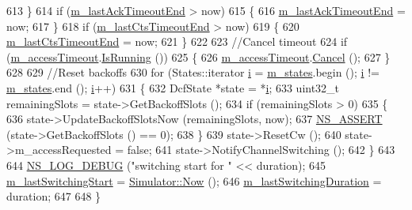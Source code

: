 \begin{DoxyCode}
613     \}
614   \textcolor{keywordflow}{if} (\hyperlink{classns3_1_1DcfManager_a8a224e47f94cc69bc3dd0d88f2099a15}{m\_lastAckTimeoutEnd} > now)
615     \{
616       \hyperlink{classns3_1_1DcfManager_a8a224e47f94cc69bc3dd0d88f2099a15}{m\_lastAckTimeoutEnd} = now;
617     \}
618   \textcolor{keywordflow}{if} (\hyperlink{classns3_1_1DcfManager_abeffda3976f92d50616835e3b8b34e32}{m\_lastCtsTimeoutEnd} > now)
619     \{
620       \hyperlink{classns3_1_1DcfManager_abeffda3976f92d50616835e3b8b34e32}{m\_lastCtsTimeoutEnd} = now;
621     \}
622 
623   \textcolor{comment}{//Cancel timeout}
624   \textcolor{keywordflow}{if} (\hyperlink{classns3_1_1DcfManager_aa14d379408c9430ab07539536ab8d72e}{m\_accessTimeout}.\hyperlink{classns3_1_1EventId_aabf8476d1a080c199ea0c6aa9ccea372}{IsRunning} ())
625     \{
626       \hyperlink{classns3_1_1DcfManager_aa14d379408c9430ab07539536ab8d72e}{m\_accessTimeout}.\hyperlink{classns3_1_1EventId_a993ae94e48e014e1afd47edb16db7a11}{Cancel} ();
627     \}
628 
629   \textcolor{comment}{//Reset backoffs}
630   \textcolor{keywordflow}{for} (States::iterator \hyperlink{bernuolliDistribution_8m_a6f6ccfcf58b31cb6412107d9d5281426}{i} = \hyperlink{classns3_1_1DcfManager_a4999c9465af21e3ff6e0949f28f17466}{m\_states}.begin (); \hyperlink{bernuolliDistribution_8m_a6f6ccfcf58b31cb6412107d9d5281426}{i} != \hyperlink{classns3_1_1DcfManager_a4999c9465af21e3ff6e0949f28f17466}{m\_states}.end (); 
      \hyperlink{bernuolliDistribution_8m_a6f6ccfcf58b31cb6412107d9d5281426}{i}++)
631     \{
632       DcfState *state = *\hyperlink{bernuolliDistribution_8m_a6f6ccfcf58b31cb6412107d9d5281426}{i};
633       uint32\_t remainingSlots = state->GetBackoffSlots ();
634       \textcolor{keywordflow}{if} (remainingSlots > 0)
635         \{
636           state->UpdateBackoffSlotsNow (remainingSlots, now);
637           \hyperlink{assert_8h_a6dccdb0de9b252f60088ce281c49d052}{NS\_ASSERT} (state->GetBackoffSlots () == 0);
638         \}
639       state->ResetCw ();
640       state->m\_accessRequested = \textcolor{keyword}{false};
641       state->NotifyChannelSwitching ();
642     \}
643 
644   \hyperlink{group__logging_ga413f1886406d49f59a6a0a89b77b4d0a}{NS\_LOG\_DEBUG} (\textcolor{stringliteral}{"switching start for "} << duration);
645   \hyperlink{classns3_1_1DcfManager_afdb592d5f09af096f13c275834e16516}{m\_lastSwitchingStart} = \hyperlink{classns3_1_1Simulator_ac3178fa975b419f7875e7105be122800}{Simulator::Now} ();
646   \hyperlink{classns3_1_1DcfManager_addb6585ae1360770ff609e7b944cbbf7}{m\_lastSwitchingDuration} = duration;
647 
648 \}
\end{DoxyCode}


